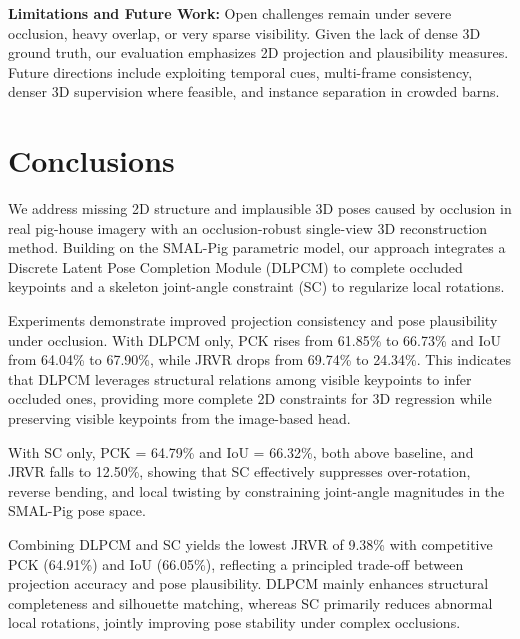 \documentclass[computers,article,submit,pdftex,moreauthors]{Definitions/mdpi}
\begin{document}
\textbf{Limitations and Future Work:} Open challenges remain under severe occlusion, heavy overlap, or very sparse visibility. Given the lack of dense 3D ground truth, our evaluation emphasizes 2D projection and plausibility measures. Future directions include exploiting temporal cues, multi-frame consistency, denser 3D supervision where feasible, and instance separation in crowded barns.

\section{Conclusions}\label{sec:conclusions}

We address missing 2D structure and implausible 3D poses caused by occlusion in real pig-house imagery with an occlusion-robust single-view 3D reconstruction method. Building on the SMAL-Pig parametric model, our approach integrates a Discrete Latent Pose Completion Module (DLPCM) to complete occluded keypoints and a skeleton joint-angle constraint (SC) to regularize local rotations.

Experiments demonstrate improved projection consistency and pose plausibility under occlusion. With DLPCM only, PCK rises from 61.85\% to 66.73\% and IoU from 64.04\% to 67.90\%, while JRVR drops from 69.74\% to 24.34\%. This indicates that DLPCM leverages structural relations among visible keypoints to infer occluded ones, providing more complete 2D constraints for 3D regression while preserving visible keypoints from the image-based head.

With SC only, PCK = 64.79\% and IoU = 66.32\%, both above baseline, and JRVR falls to 12.50\%, showing that SC effectively suppresses over-rotation, reverse bending, and local twisting by constraining joint-angle magnitudes in the SMAL-Pig pose space.

Combining DLPCM and SC yields the lowest JRVR of 9.38\% with competitive PCK (64.91\%) and IoU (66.05\%), reflecting a principled trade-off between projection accuracy and pose plausibility. DLPCM mainly enhances structural completeness and silhouette matching, whereas SC primarily reduces abnormal local rotations, jointly improving pose stability under complex occlusions.

\end{document}
